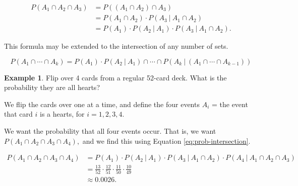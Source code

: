\documentclass[
]{book}
\theoremstyle{definition}
\theoremstyle{definition}
\newtheorem{example}{Example}[chapter]
\theoremstyle{definition}
\theoremstyle{definition}
\theoremstyle{remark}
\begin{document}
\begin{align*}
P(A_1 \cap A_2 \cap A_3) &= P((A_1\cap A_2) \cap A_3) \\
                         &= P(A_1 \cap A_2) \cdot P(A_3~|~A_1 \cap A_2)\\
                         &= P(A_1) \cdot P(A_2~|~A_1) \cdot P(A_3~|~A_1 \cap A_2).
\end{align*}

This formula may be extended to the intersection of any number of sets.

\begin{equation} 
  P(A_1 \cap \cdots \cap A_k) = P(A_1) \cdot P(A_2 ~|~ A_1) \cap  \cdots \cap P(A_k ~|~ (A_1 \cap \cdots \cap A_{k-1}))
  \label{eq:prob-intersection}
\end{equation}

\begin{example}
\protect\hypertarget{exm:all-hearts}{}\label{exm:all-hearts}Flip over 4 cards from a regular 52-card deck. What is the probability they are all hearts?

We flip the cards over one at a time, and define the four events \(A_i\) = the event that card \(i\) is a hearts, for \(i = 1, 2, 3, 4\).

We want the probability that all four events occur. That is, we want \(P(A_1 \cap A_2 \cap A_3 \cap A_4),\) and we find this using Equation \eqref{eq:prob-intersection}.

\begin{align*}
P(A_1 \cap A_2 \cap A_3 \cap A_4) &= P(A_1) \cdot P(A_2 ~|~ A_1) \cdot P(A_3 ~|~ A_1 \cap A_2) \cdot P(A_4 ~|~ A_1 \cap A_2 \cap A_{3})\\
&= \frac{13}{52} \cdot \frac{12}{51} \cdot \frac{11}{50} \cdot \frac{10}{49} \\
&\approx 0.0026.
\end{align*}
\end{example}
\end{document}
